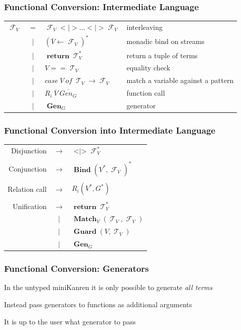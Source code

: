 \documentclass[xcolor=table, aspectratio=169]{beamer}
\DeclareMathOperator{\Term}{\mathcal{T}}
\DeclareMathOperator{\Fun}{\mathcal{F}}
\DeclareMathOperator{\Rtrn}{\mathbf{return}}
\DeclareMathOperator{\Bind}{\mathbf{Bind}}
\DeclareMathOperator{\Match}{\mathbf{Match}}
\DeclareMathOperator{\Sum}{\mathbf{<|>}}
\DeclareMathOperator{\Guard}{\mathbf{Guard}}
\DeclareMathOperator{\Gen}{\mathbf{Gen}}
\newcommand{\LIST}[1]{ #1^*}
\begin{document}
\begin{frame}[fragile]
  \frametitle{Functional Conversion: Intermediate Language}
\begin{center}
\begin{tabular}{lcll}
    $\Fun_{V}$ & $=$ & $\Fun_{V} <|> \dots <|> \Fun_{V}$ & interleaving\\
               & $\mid$ & $\LIST{\left(\overline{V} \leftarrow \Fun_{V}\right)} $ & monadic bind on streams\\
               & $\mid$ & $\Rtrn \LIST{\Term_{V}}$ & return a tuple of terms\\
               & $\mid$ & $V == \Term_{V}$ & equality check\\
               & $\mid$ &  $case \ V \ of \ \Term_{V} \rightarrow \Fun_{V}$& match a variable against a pattern\\
               & $\mid$ & $R_i \ \overline{V} \ \overline{Gen_{G}}$ & function call\\
               & $\mid$ & $\Gen_{G}$ & generator
\end{tabular}
\end{center}
\end{frame}

\begin{frame}[fragile]
  \frametitle{Functional Conversion into Intermediate Language}
\begin{center}
\begin{tabular}{rcl}
  Disjunction   & $\rightarrow$ & $\Sum\LIST{\Fun_{V}}$ \\ && \\
  Conjunction   & $\rightarrow$ & $ \Bind\LIST{\left(\LIST{V}, \Fun_{V}\right)}$ \\ && \\
  Relation call & $\rightarrow$ & $ R_{i}(\LIST{V}, \LIST{G})$ \\ && \\
  Unification   & $\rightarrow$ & $\Rtrn \LIST{\Term_{V}}$ \\
                & $|$           & $\Match_{V} \left( \Term_{V}, \Fun_{V} \right)$ \\
                & $|$           & $\Guard\left( V, \Term_{V}\right)$ \\
                & $|$           & $\Gen_{G}$
\end{tabular}
\end{center}
\end{frame}


\begin{frame}[fragile]
  \frametitle{Functional Conversion: Generators}
\begin{center}
  In the untyped miniKanren it is only possible to generate \emph{all terms}
\end{center}

\vfill

\begin{center}
  Instead pass generators to functions as additional arguments


  It is up to the user what generator to pass
\end{center}


\end{frame}
\end{document}
